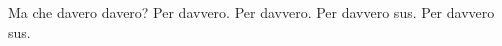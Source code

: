\documentclass{article}
\begin{document}
Ma che davero davero?
Per davvero.
Per davvero.
Per davvero sus.
Per davvero sus.
\end{document}
